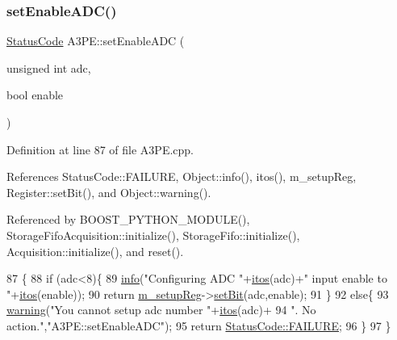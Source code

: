 \subsubsection{\texorpdfstring{set\+Enable\+A\+D\+C()}{setEnableADC()}}
{\footnotesize\ttfamily \hyperlink{classStatusCode}{Status\+Code} A3\+P\+E\+::set\+Enable\+A\+DC (\begin{DoxyParamCaption}\item[{unsigned int}]{adc,  }\item[{bool}]{enable }\end{DoxyParamCaption})}



Definition at line 87 of file A3\+P\+E.\+cpp.



References Status\+Code\+::\+F\+A\+I\+L\+U\+RE, Object\+::info(), itos(), m\+\_\+setup\+Reg, Register\+::set\+Bit(), and Object\+::warning().



Referenced by B\+O\+O\+S\+T\+\_\+\+P\+Y\+T\+H\+O\+N\+\_\+\+M\+O\+D\+U\+L\+E(), Storage\+Fifo\+Acquisition\+::initialize(), Storage\+Fifo\+::initialize(), Acquisition\+::initialize(), and reset().


\begin{DoxyCode}
87                                                           \{
88   \textcolor{keywordflow}{if} (adc<8)\{
89     \hyperlink{classObject_a644fd329ea4cb85f54fa6846484b84a8}{info}(\textcolor{stringliteral}{"Configuring ADC "}+\hyperlink{Tools_8h_af330027dbdafb9a30768b3613c553e60}{itos}(adc)+\textcolor{stringliteral}{" input enable to "}+\hyperlink{Tools_8h_af330027dbdafb9a30768b3613c553e60}{itos}(enable));
90     \textcolor{keywordflow}{return} \hyperlink{classA3PE_a142fa10b7e705c4701ae21678ec2ec8a}{m\_setupReg}->\hyperlink{classRegister_ab094246dd12aa7e0aa0ca917f4e70b31}{setBit}(adc,enable);
91   \}
92   \textcolor{keywordflow}{else}\{
93     \hyperlink{classObject_a65cd4fda577711660821fd2cd5a3b4c9}{warning}(\textcolor{stringliteral}{"You cannot setup adc number "}+\hyperlink{Tools_8h_af330027dbdafb9a30768b3613c553e60}{itos}(adc)+
94         \textcolor{stringliteral}{". No action."},\textcolor{stringliteral}{"A3PE::setEnableADC"});
95     \textcolor{keywordflow}{return} \hyperlink{classStatusCode_a6f565cbeadc76d14c72f047e5e85eb4ba3da73d4c469762eb9d3c960368252b26}{StatusCode::FAILURE};
96   \}
97 \}
\end{DoxyCode}
\mbox{\label{classA3PE_a4d8f78a1b09b409f288b34d503c71146}} 
